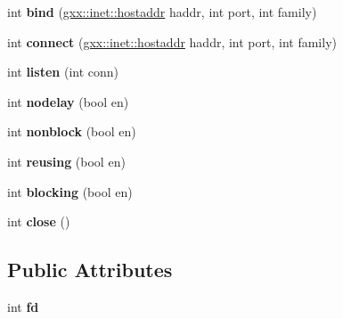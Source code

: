 \begin{DoxyCompactItemize}
\item 
int {\bfseries bind} (\hyperlink{classgxx_1_1hostaddr}{gxx\+::inet\+::hostaddr} haddr, int port, int family)\hypertarget{structgxx_1_1inet_1_1socket_a785380a21643bcdc83a6f81eac8f2cec}{}\label{structgxx_1_1inet_1_1socket_a785380a21643bcdc83a6f81eac8f2cec}

\item 
int {\bfseries connect} (\hyperlink{classgxx_1_1hostaddr}{gxx\+::inet\+::hostaddr} haddr, int port, int family)\hypertarget{structgxx_1_1inet_1_1socket_a4b3a9d3a51f92ebd29b4b402351bae13}{}\label{structgxx_1_1inet_1_1socket_a4b3a9d3a51f92ebd29b4b402351bae13}

\item 
int {\bfseries listen} (int conn)\hypertarget{structgxx_1_1inet_1_1socket_abacb6ac85be4192023f84e74f4c6340f}{}\label{structgxx_1_1inet_1_1socket_abacb6ac85be4192023f84e74f4c6340f}

\item 
int {\bfseries nodelay} (bool en)\hypertarget{structgxx_1_1inet_1_1socket_acae888b1d58ec2992227010c3ed40505}{}\label{structgxx_1_1inet_1_1socket_acae888b1d58ec2992227010c3ed40505}

\item 
int {\bfseries nonblock} (bool en)\hypertarget{structgxx_1_1inet_1_1socket_a2e229b643a3b32cd9ec8a4b90c12d957}{}\label{structgxx_1_1inet_1_1socket_a2e229b643a3b32cd9ec8a4b90c12d957}

\item 
int {\bfseries reusing} (bool en)\hypertarget{structgxx_1_1inet_1_1socket_a627afb082eaf29203a6e8e17e15108cb}{}\label{structgxx_1_1inet_1_1socket_a627afb082eaf29203a6e8e17e15108cb}

\item 
int {\bfseries blocking} (bool en)\hypertarget{structgxx_1_1inet_1_1socket_ad12aafcd4b12a38ea6b7b63c679ddc02}{}\label{structgxx_1_1inet_1_1socket_ad12aafcd4b12a38ea6b7b63c679ddc02}

\item 
int {\bfseries close} ()\hypertarget{structgxx_1_1inet_1_1socket_aeb20472fff1ed85e8341b84e01269d5d}{}\label{structgxx_1_1inet_1_1socket_aeb20472fff1ed85e8341b84e01269d5d}

\end{DoxyCompactItemize}
\subsection*{Public Attributes}
\begin{DoxyCompactItemize}
\item 
int {\bfseries fd}\hypertarget{structgxx_1_1inet_1_1socket_a0919e47c46750635642cd8b7d6106667}{}\label{structgxx_1_1inet_1_1socket_a0919e47c46750635642cd8b7d6106667}

\end{DoxyCompactItemize}


